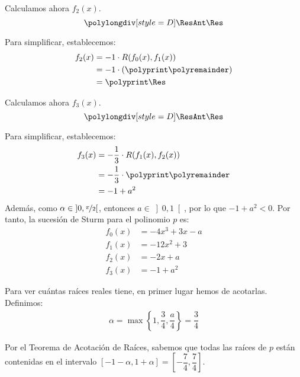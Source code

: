 \begin{ejercicio}
\begin{enumerate}
        Calculamos ahora $f_2(x)$.
        \begin{equation*}
            \polylongdiv[style=D]\ResAnt\Res
        \end{equation*}
        \polydiv\div\ResAnt\Res
        \polymul\ResAnt{}
        \polymul\Res{}

        Para simplificar, establecemos:
        \begin{align*}
            f_2(x) &= -1\cdot R(f_0(x), f_1(x))\\
            &= -1\cdot \left(\polyprint\polyremainder\right)\\
            &= \polyprint\Res
        \end{align*}

        Calculamos ahora $f_3(x)$.
        \begin{equation*}
            \polylongdiv[style=D]\ResAnt\Res
        \end{equation*}
        \polydiv\div\ResAnt\Res
        \polymul\ResAnt{}
        \polymul\Res{}

        Para simplificar, establecemos:
        \begin{align*}
            f_3(x) &= -\frac{1}{3}\cdot R(f_1(x), f_2(x))\\
            &= -\frac{1}{3}\cdot \polyprint\polyremainder\\
            &= -1+a^2
        \end{align*}
        Además, como $\alpha\in \left]0,\nicefrac{\pi}{2}\right[$, entonces $a\in \left]0, 1\right[$, por lo que $-1+a^2<0$. Por tanto, la sucesión de Sturm para el polinomio $p$ es:
        \begin{align*}
            f_0(x) &= -4x^3 + 3x - a\\
            f_1(x) &= -12x^2 + 3\\
            f_2(x) &= -2x+a\\
            f_3(x) &= -1+a^2
        \end{align*}

        Para ver cuántas raíces reales tiene, en primer lugar hemos de acotarlas. Definimos:
        \begin{align*}
            \alpha=\max\left\{1,\dfrac{3}{4},\dfrac{a}{4}\right\}=\dfrac{3}{4}
        \end{align*}
        
        Por el Teorema de Acotación de Raíces, sabemos que todas las raíces de $p$ están contenidas en el intervalo $[-1-\alpha, 1+\alpha]=\left[-\dfrac{7}{4}, \dfrac{7}{4}\right]$.
        

\end{enumerate}
\end{ejercicio}
